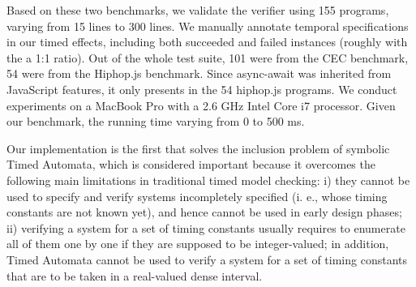 \documentclass[acmsmall,10pt,review]{acmart}
\begin{document}
{%


   

Based on these two benchmarks, we validate the verifier using 155  programs, varying from 15 lines to 300 lines. We manually annotate temporal specifications in our timed effects, including both succeeded and failed instances (roughly with the a 1:1 ratio). 
Out of the whole test suite, 101 were from the CEC benchmark, 54 were from the Hiphop.js benchmark.  Since async-await was inherited from JavaScript features, it only presents in the 54 hiphop.js programs.
We conduct experiments on a MacBook Pro with a 2.6 GHz Intel Core i7 processor. Given our benchmark, the running time varying from 0 to 500 ms. 


Our implementation is the first that solves the  inclusion problem of symbolic Timed Automata, which is considered important because it overcomes the following main limitations in traditional timed model checking:  i) they cannot be used to specify and verify systems incompletely specified (i. e., whose timing constants are not known yet), and hence cannot be used in early design phases; ii) verifying a system for a set of timing constants usually requires to enumerate all of them one by one if they are supposed to be integer-valued; in addition, Timed Automata cannot be used to verify a system for a set of timing constants that are to be taken in a real-valued dense interval. 



}
\end{document}
